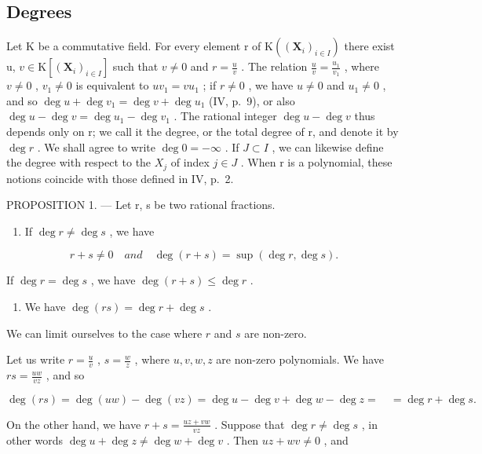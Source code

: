 \subsection{Degrees}

Let K be a commutative field. For every element r of \(\mathrm{K}((\mathbf{X}_{i})_{i\in I})\) there exist u, \(v\in\mathrm{K}[(\mathbf{X}_{i})_{i\in I}]\) such that \(v\neq0\) and \(r=\frac{u}{v}\) . The relation \(\frac{u}{v}=\frac{u_{1}}{v_{1}}\) , where \(v\neq0\) , \(v_{1}\neq0\) is equivalent to \(uv_{1}=vu_{1}\) ; if \(r\neq0\) , we have \(u\neq0\) and \(u_{1}\neq0\) , and so \(\deg u+\deg v_{1}=\deg v+\deg u_{1}\) (IV, p.~9), or also \(\deg u-\deg v=\deg u_{1}-\deg v_{1}\) . The rational integer \(\deg u-\deg v\) thus depends only on r; we call it the degree, or the total degree of r, and denote it by \(\deg r\) . We shall agree to write \(\deg0=-\infty\) . If \(J\subset I\) , we can likewise define the degree with respect to the \(X_{j}\) of index \(j\in J\) . When r is a polynomial, these notions coincide with those defined in IV, p.~2.

PROPOSITION 1. --- Let r, s be two rational fractions.

\begin{enumerate}
\def\labelenumi{(\roman{enumi})}
\tightlist
\item
  If \(\deg r \neq \deg s\) , we have
\end{enumerate}

\[
r + s \neq 0 \quad a n d \quad \deg (r + s) = \sup (\deg r, \deg s).
\]

If \(\deg r = \deg s\) , we have \(\deg (r + s) \leqslant \deg r\) .

\begin{enumerate}
\def\labelenumi{(\roman{enumi})}
\setcounter{enumi}{1}
\tightlist
\item
  We have \(\deg(rs) = \deg r + \deg s\) .
\end{enumerate}

We can limit ourselves to the case where \(r\) and \(s\) are non-zero.

Let us write \(r = \frac{u}{v}\) , \(s = \frac{w}{z}\) , where \(u, v, w, z\) are non-zero polynomials. We have \(rs = \frac{uw}{vz}\) , and so

\[
\deg (r s) = \deg (u w) - \deg (v z) = \deg u - \deg v + \deg w - \deg z = \quad = \deg r + \deg s.
\]

On the other hand, we have \(r + s = \frac{uz + vw}{vz}\) . Suppose that \(\deg r \neq \deg s\) , in other words \(\deg u + \deg z \neq \deg w + \deg v\) . Then \(uz + wv \neq 0\) , and

